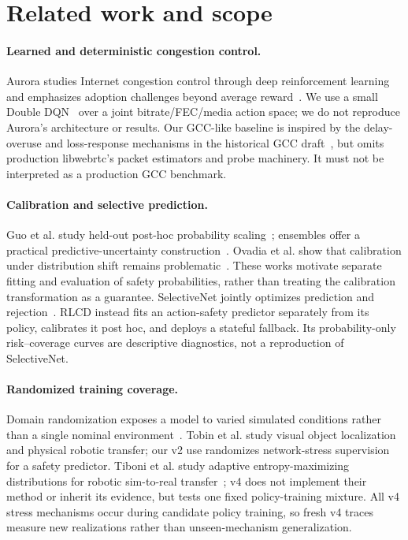 \documentclass[10pt]{article}
\begin{document}
\section{Related work and scope}
\paragraph{Learned and deterministic congestion control.}
Aurora studies Internet congestion control through deep reinforcement learning and emphasizes adoption challenges beyond average reward~\cite{jay2019aurora}. We use a small Double DQN~\cite{hasselt2016double} over a joint bitrate/FEC/media action space; we do not reproduce Aurora's architecture or results. Our GCC-like baseline is inspired by the delay-overuse and loss-response mechanisms in the historical GCC draft~\cite{holmer2016gcc}, but omits production libwebrtc's packet estimators and probe machinery. It must not be interpreted as a production GCC benchmark.

\paragraph{Calibration and selective prediction.}
Guo et al. study held-out post-hoc probability scaling~\cite{guo2017calibration}; ensembles offer a practical predictive-uncertainty construction~\cite{lakshminarayanan2017ensembles}. Ovadia et al. show that calibration under distribution shift remains problematic~\cite{ovadia2019shift}. These works motivate separate fitting and evaluation of safety probabilities, rather than treating the calibration transformation as a guarantee. SelectiveNet jointly optimizes prediction and rejection~\cite{geifman2019selectivenet}. RLCD instead fits an action-safety predictor separately from its policy, calibrates it post hoc, and deploys a stateful fallback. Its probability-only risk--coverage curves are descriptive diagnostics, not a reproduction of SelectiveNet.

\paragraph{Randomized training coverage.}
Domain randomization exposes a model to varied simulated conditions rather than a single nominal environment~\cite{tobin2017randomization}. Tobin et al. study visual object localization and physical robotic transfer; our v2 use randomizes network-stress supervision for a safety predictor. Tiboni et al. study adaptive entropy-maximizing distributions for robotic sim-to-real transfer~\cite{tiboni2023doraemon}; v4 does not implement their method or inherit its evidence, but tests one fixed policy-training mixture. All v4 stress mechanisms occur during candidate policy training, so fresh v4 traces measure new realizations rather than unseen-mechanism generalization.
\end{document}
